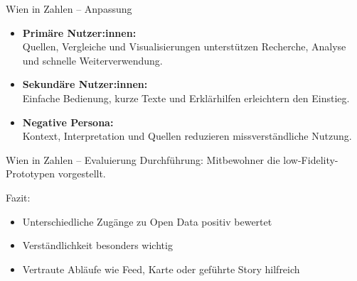 \begin{frame}{Wien in Zahlen -- Anpassung}
  \centering
  \begin{minipage}{0.82\textwidth}
    \begin{itemize}
      \setlength\itemsep{0.85em}

      \item \textbf{Primäre Nutzer:innen:}\\
      Quellen, Vergleiche und Visualisierungen unterstützen Recherche, Analyse und schnelle Weiterverwendung.

      \item \textbf{Sekundäre Nutzer:innen:}\\
      Einfache Bedienung, kurze Texte und Erklärhilfen erleichtern den Einstieg.

      \item \textbf{Negative Persona:}\\
      Kontext, Interpretation und Quellen reduzieren missverständliche Nutzung.

    \end{itemize}
  \end{minipage}

\end{frame}

\begin{frame}{Wien in Zahlen -- Evaluierung}
  \alert{Durchführung:} Mitbewohner die low-Fidelity-Prototypen vorgestellt.

  \vspace{0.4cm}
  \alert{Fazit:}
  \begin{itemize}
    \item Unterschiedliche Zugänge zu Open Data positiv bewertet
    \item Verständlichkeit besonders wichtig
    \item Vertraute Abläufe wie Feed, Karte oder geführte Story hilfreich
  \end{itemize}
\end{frame}